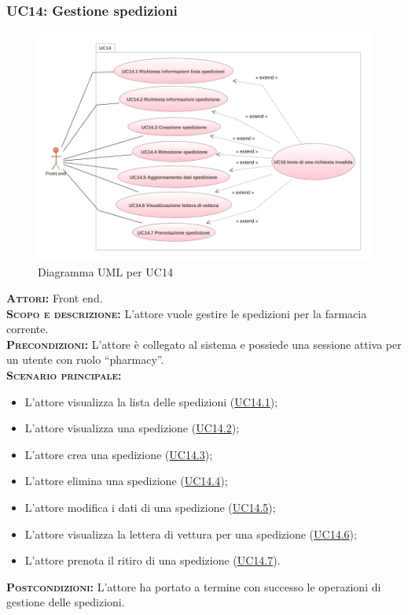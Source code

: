 \subsubsection{UC14: Gestione spedizioni}
\label{sec:UC14}
\begin{figure}[h!]
    \centering
    \includegraphics[width=\textwidth]{figures/uc/uc14.png}
    \caption[Diagramma UML per UC14]{Diagramma UML per UC14
    \label{fig:uc14}}
\end{figure}
\textsc{\textbf{Attori:}} Front end.\\
\textsc{\textbf{Scopo e descrizione:}} L'attore vuole gestire le spedizioni per la farmacia corrente.\\
\textsc{\textsc{\textbf{Precondizioni:}}} L'attore è collegato al sistema e possiede una sessione attiva per un utente con ruolo ``pharmacy''.\\
\textsc{\textbf{Scenario principale:}}
\begin{itemize}
    \item L'attore visualizza la lista delle spedizioni (\hyperref[sec:UC141]{UC14.1});
    \item L'attore visualizza una spedizione (\hyperref[sec:UC142]{UC14.2});
    \item L'attore crea una spedizione (\hyperref[sec:UC143]{UC14.3});
    \item L'attore elimina una spedizione (\hyperref[sec:UC144]{UC14.4});
    \item L'attore modifica i dati di una spedizione (\hyperref[sec:UC145]{UC14.5});
    \item L'attore visualizza la lettera di vettura per una spedizione (\hyperref[sec:UC146]{UC14.6});
    \item L'attore prenota il ritiro di una spedizione (\hyperref[sec:UC147]{UC14.7}).
\end{itemize}
\textsc{\textbf{Postcondizioni:}} L'attore ha portato a termine con successo le operazioni di gestione delle spedizioni.

